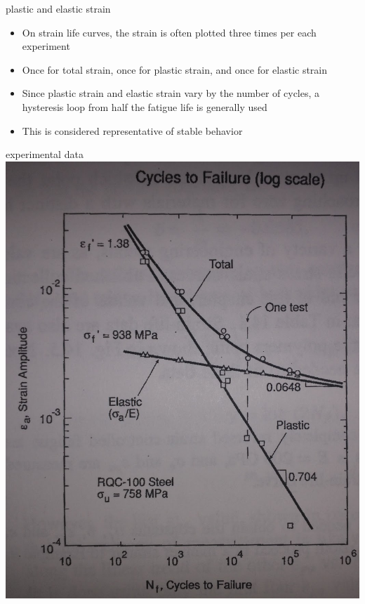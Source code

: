 \documentclass[
  letterpaper,
  ignorenonframetext,
  aspectratio=43,
  handout,
  12pt]{beamer}
\providecommand{\tightlist}{%
  \setlength{\itemsep}{0pt}\setlength{\parskip}{0pt}}
\providecommand{\tightlist}{%
\setlength{\itemsep}{0pt}\setlength{\parskip}{0pt}}
\let\Oldincludegraphics\includegraphics
\renewcommand{\includegraphics}[2][]{\Oldincludegraphics[width=\textwidth,height=0.7\textheight,keepaspectratio]{#2}}
\begin{document}
\begin{frame}{plastic and elastic strain}
\protect\hypertarget{plastic-and-elastic-strain-1}{}
\begin{itemize}
\tightlist
\item
  On strain life curves, the strain is often plotted three times per
  each experiment
\item
  Once for total strain, once for plastic strain, and once for elastic
  strain
\item
  Since plastic strain and elastic strain vary by the number of cycles,
  a hysteresis loop from half the fatigue life is generally used
\item
  This is considered representative of stable behavior
\end{itemize}
\end{frame}

\begin{frame}{experimental data}
\protect\hypertarget{experimental-data}{}
\includegraphics{../images/strain-life.jpg}
\end{frame}
\end{document}
